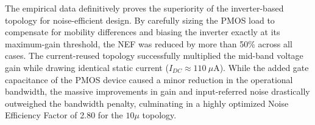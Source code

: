 \documentclass[12pt, a4paper]{article}
\begin{document}
The empirical data definitively proves the superiority of the inverter-based topology for noise-efficient design. By carefully sizing the PMOS load to compensate for mobility differences and biasing the inverter exactly at its maximum-gain threshold, the NEF was reduced by more than 50\% across all cases. The current-reused topology successfully multiplied the mid-band voltage gain while drawing identical static current ($I_{DC} \approx 110 \ \mu\text{A}$). While the added gate capacitance of the PMOS device caused a minor reduction in the operational bandwidth, the massive improvements in gain and input-referred noise drastically outweighed the bandwidth penalty, culminating in a highly optimized Noise Efficiency Factor of 2.80 for the $10\mu$ topology.
\end{document}
